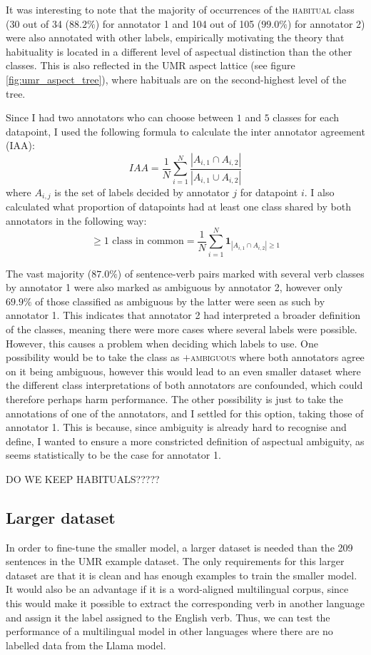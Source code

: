 It was interesting to note that the majority of occurrences of the \textsc{habitual} class (30 out of 34 ($88.2\%$) for annotator 1 and 104 out of 105 ($99.0\%$) for annotator 2) were also annotated with other labels, empirically motivating the theory that habituality is located in a different level of aspectual distinction than the other classes. This is also reflected in the UMR aspect lattice (see figure \ref{fig:umr_aspect_tree}), where habituals are on the second-highest level of the tree. 

Since I had two annotators who can choose between $1$ and $5$ classes for each datapoint, I used the following formula to calculate the inter annotator agreement (IAA):
$$IAA = \frac{1}{N}\sum_{i=1}^{N}\frac{|A_{i,1} \cap A_{i,2}|}{|A_{i,1} \cup A_{i,2}|}$$
where $A_{i,j}$ is the set of labels decided by annotator $j$ for datapoint $i$. I also calculated what proportion of datapoints had at least one class shared by both annotators in the following way:
$$\geq 1 \text{ class in common} = \frac{1}{N}\sum_{i=1}^{N}\mathbf{1}_{|A_{i,1} \cap A_{i,2}| \geq 1}$$

The vast majority ($87.0\%$) of sentence-verb pairs marked with several verb classes by annotator 1 were also marked as ambiguous by annotator 2, however only $69.9\%$ of those classified as ambiguous by the latter were seen as such by annotator 1. This indicates that annotator 2 had interpreted a broader definition of the classes, meaning there were more cases where several labels were possible. However, this causes a problem when deciding which labels to use. One possibility would be to take the class as $+$\textsc{ambiguous} where both annotators agree on it being ambiguous, however this would lead to an even smaller dataset where the different class interpretations of both annotators are confounded, which could therefore perhaps harm performance. The other possibility is just to take the annotations of one of the annotators, and I settled for this option, taking those of annotator 1. This is because, since ambiguity is already hard to recognise and define, I wanted to ensure a more constricted definition of aspectual ambiguity, as seems statistically to be the case for annotator 1.

DO WE KEEP HABITUALS?????

\subsection{Larger dataset}
In order to fine-tune the smaller model, a larger dataset is needed than the 209 sentences in the UMR example dataset. The only requirements for this larger dataset are that it is clean and has enough examples to train the smaller model. It would also be an advantage if it is a word-aligned multilingual corpus, since this would make it possible to extract the corresponding verb in another language and assign it the label assigned to the English verb. Thus, we can test the performance of a multilingual model in other languages where there are no labelled data from the Llama model. 

